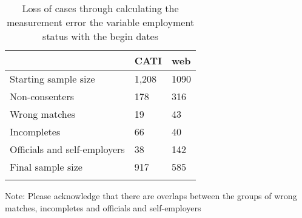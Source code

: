 \begin{table}[h]
	\centering
	\caption{Loss of cases through calculating the measurement error the variable employment status with the begin dates}\label{tab:loss of cases}
	\begin{tabularx}{\textwidth}{Xll}
		\addlinespace \addlinespace
		& CATI & web \\ 
		\midrule
		\addlinespace
		Starting sample size		&1,208&1090  \\ \addlinespace \addlinespace
		Non-consenters				&178&316 \\ \addlinespace
		Wrong matches				&19&43  \\ \addlinespace 	
		Incompletes 					&66&40    \\ \addlinespace
		Officials and self-employers&38&142    \\ \addlinespace \addlinespace
		Final sample size			&917&585   \\ \addlinespace	
		\bottomrule    
	\end{tabularx}
	\small
	\begin{tablenotes}
		\begin{footnotesize}
\item Note: Please acknowledge that there are overlaps between the groups of wrong matches, incompletes and officials and self-employers
		\end{footnotesize}
	\end{tablenotes}
\end{table}